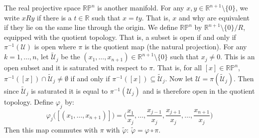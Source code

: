 \documentclass{article}                                                        %
\begin{document}
                \begin{example}
                    The real projective space $\mathbb{RP}^{n}$ is another
                    manifold. For any $x,y\in\mathbb{R}^{n+1}\setminus\{0\}$,
                    we write $xRy$ if there is a $t\in\mathbb{R}$ such that
                    $x=ty$. That is, $x$ and why are equivalent if they lie on
                    the same line through the origin. We define
                    $\mathbb{RP}^{n}$ by $\mathbb{R}^{n+1}\setminus\{0\}/R$,
                    equipped with the quotient topology. That is, a subset is
                    open if and only if $\pi^{\minus{1}}(\mathcal{U})$ is open
                    where $\pi$ is the quotient map (the natural projection).
                    For any $k=1,\dots,n$, let $\tilde{\mathcal{U}}_{j}$ be the
                    $(x_{1},\dots,x_{n+1})\in\mathbb{R}^{n+1}\setminus\{0\}$
                    such that $x_{j}\ne{0}$. This is an open subset and it is
                    saturated with respect to $\pi$. That is, for all
                    $[x]\in\mathbb{RP}^{n}$,
                    $\pi^{\minus{1}}([x])\cap\tilde{\mathcal{U}}_{j}\ne\emptyset$
                    if and only if $\pi^{\minus{1}}([x])\subseteq\tilde{\mathcal{U}}_{j}$.
                    Now let $\mathcal{U}=\pi(\tilde{\mathcal{U}}_{j})$. Then
                    since $\tilde{\mathcal{U}}_{j}$ is saturated it is equal
                    to $\pi^{\minus{1}}(\mathcal{U}_{j})$ and is therefore
                    open in the quotient topology. Define $\varphi_{j}$ by:
                    \begin{equation}
                        \varphi_{j}\big([(x_{1},\dots,x_{n+1})]\big)
                        =\big(\frac{x_{1}}{x_{j}},\dots,
                            \frac{x_{j-1}}{x_{j}},\frac{x_{j+1}}{x_{j}},\dots,
                            \frac{x_{n+1}}{x_{j}}\big)
                    \end{equation}
                    Then this map commutes with $\pi$ with $\tilde{\varphi}$:
                    $\tilde{\varphi}=\varphi\circ\pi$.
                \end{example}
\end{document}
